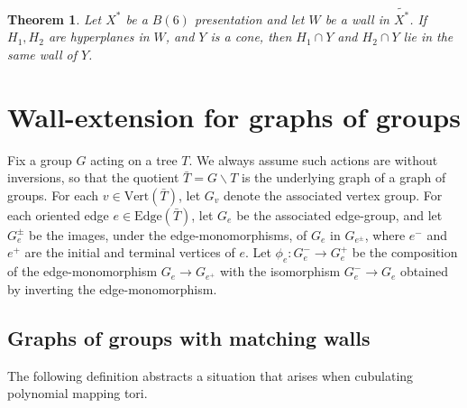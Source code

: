 \documentclass[11pt,oneside]{amsart}
\newtheorem{thm}{Theorem}[section]
\theoremstyle{definition}
\newcommand{\vertices}{\mathrm{Vert}}
\newcommand{\edges}{\mathrm{Edge}}
\begin{document}
\begin{thm}\label{thm:520}
Let $X^*$ be a $B(6)$ presentation and let $W$ be a wall in $\widetilde{X^*}$.  If $H_1,H_2$ are hyperplanes in $W$, and $Y$ is a cone, then $H_1\cap Y$ and $H_2\cap Y$ lie in the same wall of $Y$.
\end{thm}





\section{Wall-extension for graphs of groups}\label{sec:joining-walls}
Fix a group $G$ acting on a tree $T$. We always assume such actions are without inversions, so that the quotient $\bar T=G\backslash T$ is the underlying graph of a graph of groups. For each $v\in \vertices(\bar T)$, let $G_v$ denote the associated vertex group.  For each oriented edge $e\in\edges(\bar T)$, let $G_e$ be the associated edge-group, and let $G_e^\pm$ be the images, under the edge-monomorphisms, of $G_e$ in $G_{e^\pm}$, where $e^-$ and $e^+$ are the initial and terminal vertices of $e$.  Let $\phi_e:G_e^-\to G_e^+$ be the composition of the edge-monomorphism $G_e\to G_{e^+}$ with the isomorphism $G_e^-\to G_e$ obtained by inverting the  edge-monomorphism.

\subsection{Graphs of groups with matching walls}\label{subsec:matching-walls}
The following definition abstracts a situation that arises when cubulating polynomial mapping tori.
\end{document}
